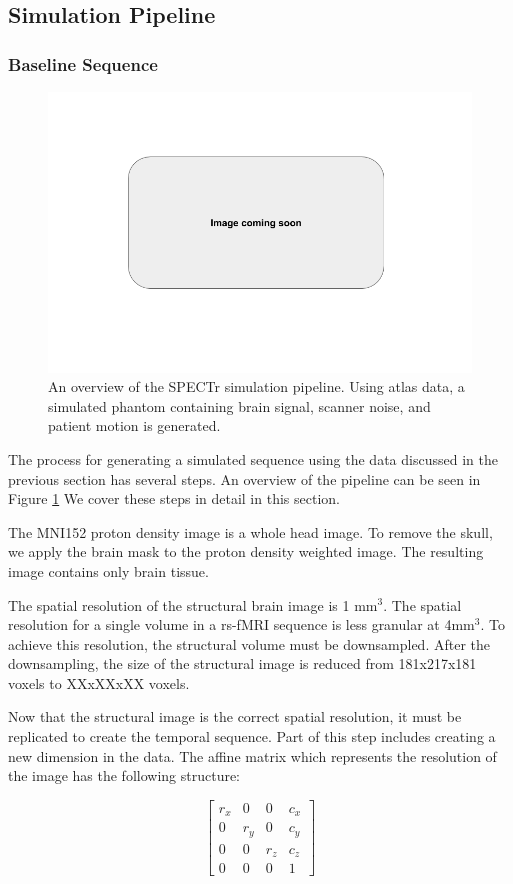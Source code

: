 \subsection{Simulation Pipeline}

\subsubsection{Baseline Sequence}

\begin{figure}
\centering
\includegraphics[width=.5\textwidth]{5/pipeline.png}
\caption{An overview of the SPECTr simulation pipeline. Using atlas data, a simulated phantom containing brain signal, scanner noise, and patient motion is generated.}
\label{ch5:spectr_flow}
\end{figure}

The process for generating a simulated sequence using the data discussed in the previous section has several steps. An overview of the pipeline can be seen in Figure \ref{ch5:spectr_flow} We cover these steps in detail in this section.

The MNI152 proton density image is a whole head image. To remove the skull, we apply the brain mask to the proton density weighted image. The resulting image contains only brain tissue.

The spatial resolution of the structural brain image is 1 mm$^3$. The spatial resolution for a single volume in a rs-fMRI sequence is less granular at 4mm$^3$. To achieve this resolution, the structural volume must be downsampled. After the downsampling, the size of the structural image is reduced from 181x217x181 voxels to XXxXXxXX voxels. %

Now that the structural image is the correct spatial resolution, it must be replicated to create the temporal sequence. Part of this step includes creating a new dimension in the data. The affine matrix which represents the resolution of the image has the following structure:

\begin{equation}
\begin{bmatrix}
 r_x &  0   &  0   & c_x\\ 
 0   &  r_y &  0   & c_y \\ 
 0   &  0   &  r_z & c_z \\ 
 0   &  0   &  0   & 1 
\end{bmatrix}
\end{equation}

